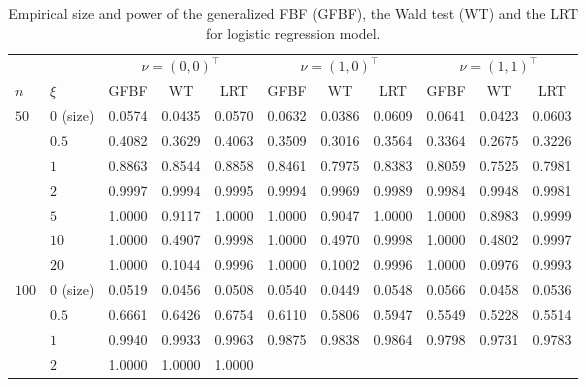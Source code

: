 \documentclass[11pt]{article}
\newcommand{\myT}{\intercal}
\theoremstyle{plain}
\theoremstyle{definition}
\theoremstyle{remark}
\begin{document}
\begin{table}[ht]
    \caption{Empirical size and power of the generalized FBF (GFBF), the Wald test (WT) and the LRT for logistic regression model.}
    \label{logistic_table1}
    \centering
    \begin{tabular}{llccccccccc}
        \toprule
        && \multicolumn{3}{c}{$\nu = (0,0)^\myT$} &\multicolumn{3}{c}{$\nu = (1,0)^\myT$} &\multicolumn{3}{c}{$\nu = (1,1)^\myT$}\\
        \cmidrule(r){3-5}\cmidrule(r){6-8}\cmidrule(r){9-11}
        $n$ &$\xi$ 
        &  GFBF & WT &  LRT
        &  GFBF & WT &  LRT
        &  GFBF & WT &  LRT
        \\ 
        \midrule
        $50$ 
        &$0$ (size) &
        0.0574 & 0.0435 & 0.0570 &
        0.0632 & 0.0386 & 0.0609&
        0.0641 & 0.0423 & 0.0603 
        \\
        &$0.5$ &
        0.4082 & 0.3629 & 0.4063 &
        0.3509 & 0.3016 & 0.3564 &
        0.3364 & 0.2675 & 0.3226
        \\
        &$1$ &
        0.8863 & 0.8544 & 0.8858 &
        0.8461 & 0.7975 & 0.8383 &
        0.8059 & 0.7525 & 0.7981
        \\
        &$2$ &
        0.9997 & 0.9994 & 0.9995 &
        0.9994 & 0.9969 & 0.9989 &
        0.9984 & 0.9948 & 0.9981
        \\
        &$5$ &
        1.0000 & 0.9117 & 1.0000 &
        1.0000 & 0.9047 & 1.0000 &
        1.0000 & 0.8983 & 0.9999
        \\
        &$10$  &
        1.0000  & 0.4907 & 0.9998 & %
        1.0000  & 0.4970 & 0.9998 & %
        1.0000  & 0.4802 & 0.9997  %
        \\
        &$20$  &
        1.0000  & 0.1044 & 0.9996  & 
        1.0000  & 0.1002 & 0.9996  &
        1.0000  & 0.0976 & 0.9993 
        \\
        \midrule
        $100$ 
        &$0$ (size)  &
        0.0519 & 0.0456 & 0.0508 &
        0.0540 & 0.0449 & 0.0548 &
        0.0566 & 0.0458 & 0.0536
        \\
        &$0.5$ &
        0.6661 & 0.6426 & 0.6754 &
        0.6110 & 0.5806 & 0.5947 &
        0.5549 & 0.5228 & 0.5514
        \\
        &$1$  &
        0.9940 & 0.9933 & 0.9963 &
        0.9875 & 0.9838 & 0.9864 &
        0.9798 & 0.9731 & 0.9783
        \\
        &$2$ &
        1.0000 & 1.0000 & 1.0000 &

\end{tabular}
\end{table}
\end{document}
